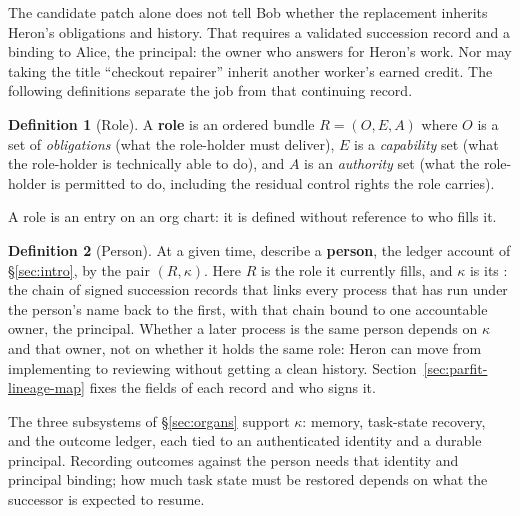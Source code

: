 \documentclass[11pt,a4paper]{article}
\theoremstyle{definition}
\newtheorem{definition}{Definition}[section]
\begin{document}
The candidate patch alone does not tell Bob whether the replacement inherits
Heron's obligations and history. That requires a validated succession record
and a binding to Alice, the principal: the owner who answers for Heron's work.
Nor may taking the title ``checkout repairer'' inherit another worker's earned
credit. The following definitions separate the job from that continuing record.

\begin{definition}[Role]\label{def:role}
\setlength{\parskip}{4pt plus 1pt}
A \textbf{role} is an ordered bundle $R = (O, E, A)$ where $O$ is a set of
\emph{obligations} (what the role-holder must deliver), $E$ is a
\emph{capability} set (what the role-holder is technically able to do), and $A$
is an \emph{authority} set (what the role-holder is permitted to do, including
the residual control rights the role carries).

A role is an entry on an org chart: it is defined without reference to who
fills it.
\end{definition}

\begin{definition}[Person]\label{def:person}
\setlength{\parskip}{4pt plus 1pt}
At a given time, describe a \textbf{person}, the ledger account of
\S\ref{sec:intro}, by the pair $(R,\kappa)$. Here $R$ is the role it currently
fills, and $\kappa$ is its : the chain of signed
succession records that links every process that has run under the person's
name back to the first, with that chain bound to one accountable owner, the
principal. Whether a later process is the same person depends on $\kappa$ and
that owner, not on whether it holds the same role: Heron can move from
implementing to reviewing without getting a clean history.
Section~\ref{sec:parfit-lineage-map} fixes the fields of each record and who
signs it.

The three subsystems of \S\ref{sec:organs} support $\kappa$: memory,
task-state recovery, and the outcome ledger, each tied to an authenticated
identity and a durable principal. Recording outcomes against the person needs
that identity and principal binding; how much task state must be restored
depends on what the successor is expected to resume.
\end{definition}
\end{document}
